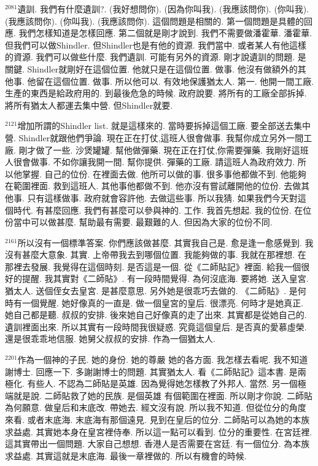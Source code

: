 \documentclass{book}
\begin{document}
$^{2081}$遺訓.
我們有什麼遺訓?.
(我好想問你).
(因為你叫我).
(我應該問你).
(你叫我).
(我應該問你).
(你叫我).
(我應該問你).
這個問題是相關的.
第一個問題是具體的回應.
我們怎樣知道是怎樣回應.
第二個就是剛才說到.
我們不需要做潘霍華.
潘霍華.
但我們可以做Shindler.
但Shindler也是有他的資源.
我們當中.
或者某人有他這樣的資源.
我們可以做些什麼.
我們遺訓.
可能有另外的資源.
剛才說遺訓的問題.
是關鍵.
Shindler就剛好在這個位置.
他就只是在這個位置.
做事.
他沒有做額外的其他事.
他留在這個位置.
做事.
所以他可以.
有效地保護猶太人.
第一.
他開一間工廠.
生產的東西是給政府用的.
到最後危急的時候.
政府說要.
將所有的工廠全部拆掉.
將所有猶太人都運去集中營.
但Shindler就要.

$^{2121}$增加所謂的Shindler list.
就是這樣來的.
當時要拆掉這個工廠.
要全部送去集中營.
Shindler就跟他們爭論.
現在正在打仗,這班人很會做事.
我幫你成立另外一間工廠.
剛才做了一些.
沙煲罐罐.
幫他做彈藥.
現在正在打仗,你需要彈藥.
我剛好這班人很會做事.
不如你讓我開一間.
幫你提供.
彈藥的工廠.
請這班人為政府效力.
所以他掌握.
自己的位份.
在裡面去做.
他所可以做的事.
很多事他都做不到.
他能夠在範圍裡面.
救到這班人.
其他事他都做不到.
他亦沒有嘗試離開他的位份.
去做其他事.
只有這樣做事.
政府就會容許他.
去做這些事.
所以我猜.
如果我們今天對這個時代.
有甚麼回應.
我們有甚麼可以參與神的.
工作.
我首先想起.
我的位份.
在位份當中可以做甚麼.
幫助最有需要.
最艱難的人.
但因為大家的位份不同.

$^{2161}$所以沒有一個標準答案.
你們應該做甚麼.
其實我自己是.
愈是逢一愈感覺到.
我沒有甚麼大意象.
其實.
上帝帶我去到哪個位置.
我能夠做的事.
我就在那裡想.
在那裡去發展.
我覺得在這個時刻.
是否這是一個.
從《二師貼記》裡面.
給我一個很好的提醒.
我其實對《二師貼》.
有一段時間覺得.
為何沒底海.
要將她.
送入皇宮.
猶太人.
送個侄女去皇宮.
是甚麼意思.
另外她是很乖巧去做的.
《二師貼》.
是何時有一個覺醒.
她好像真的一直是.
做一個皇宮的皇后.
很漂亮.
何時才是她真正.
她自己都是聽.
叔叔的安排.
後來她自己好像真的走了出來.
其實都是從她自己的.
遺訓裡面出來.
所以其實有一段時間我很疑惑.
究竟這個皇后.
是否真的愛慕虛榮.
還是很乖乖地信服.
她舅父叔叔的安排.
作為一個猶太人.

$^{2201}$作為一個神的子民.
她的身份.
她的尊嚴 她的各方面.
我怎樣去看呢.
我不知道 謝博士.
回應一下.
多謝謝博士的問題.
其實猶太人.
看《二師貼記》這本書.
是兩極化.
有些人.
不認為二師貼是英雄.
因為覺得她怎樣教了外邦人.
當然.
另一個極端就是說.
二師貼救了她的民族.
是個英雄 有個範圍在裡面.
所以剛才你說.
二師貼為何願意.
做皇后和末底改.
帶她去.
經文沒有說.
所以我不知道.
但從位分的角度來看.
或者末底海.
末底海有那個遠見.
見到在皇后的位分.
二師貼可以為她的本族求益處.
其實她本身在皇宮裡侍奉.
所以這一點可以看到.
位分的重要性.
在宮廷裡.
這其實帶出一個問題.
大家自己想想.
香港人是否需要在宮廷.
有一個位分.
為本族求益處.
其實這就是末底海.
最後一章裡做的.
所以有機會的時候.
\end{document}
